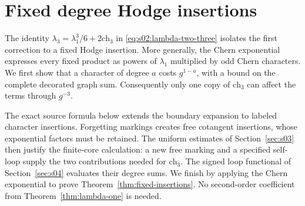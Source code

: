 \section{Fixed degree Hodge insertions}
\label{sec:s05}

The identity $\lambda_3=\lambda_1^3/6+2\mathrm{ch}_3$ in
\eqref{eq:s02:lambda-two-three} isolates the first correction to a
fixed Hodge insertion. More generally, the Chern exponential expresses
every fixed product as powers of $\lambda_1$ multiplied by odd Chern
characters. We first show that a character of degree $a$ costs
$g^{1-a}$, with a bound on the complete decorated graph sum.
Consequently only one copy of $\mathrm{ch}_3$ can affect the terms
through $g^{-3}$.

The exact source formula below extends the boundary expansion to
labeled character insertions. Forgetting markings creates free
cotangent insertions, whose exponential factors must be retained.
The uniform estimates of Section~\ref{sec:s03} then justify the
finite-core calculation: a new free marking and a specified self-loop
supply the two contributions needed for $\mathrm{ch}_3$. The signed
loop functional of Section~\ref{sec:s04} evaluates their degree sums.
We finish by applying the Chern exponential to prove
Theorem~\ref{thm:fixed-insertions}. No second-order coefficient from
Theorem~\ref{thm:lambda-one} is needed.




